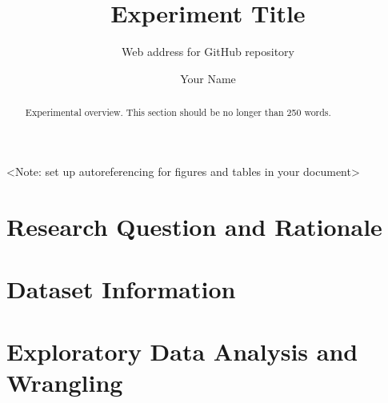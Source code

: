 \documentclass[12pt,]{article}
\title{Experiment Title}
\subtitle{Web address for GitHub repository}
\author{Your Name}
\date{}
\begin{document}
\maketitle
\begin{abstract}
Experimental overview. This section should be no longer than 250 words.
\end{abstract}

\newpage

\tableofcontents  \newpage
\listoftables  \newpage
\listoffigures  \newpage

\textless{}Note: set up autoreferencing for figures and tables in your
document\textgreater{}

\section{Research Question and
Rationale}\label{research-question-and-rationale}

\newpage

\section{Dataset Information}\label{dataset-information}

\newpage

\section{Exploratory Data Analysis and
Wrangling}\label{exploratory-data-analysis-and-wrangling}
\end{document}
